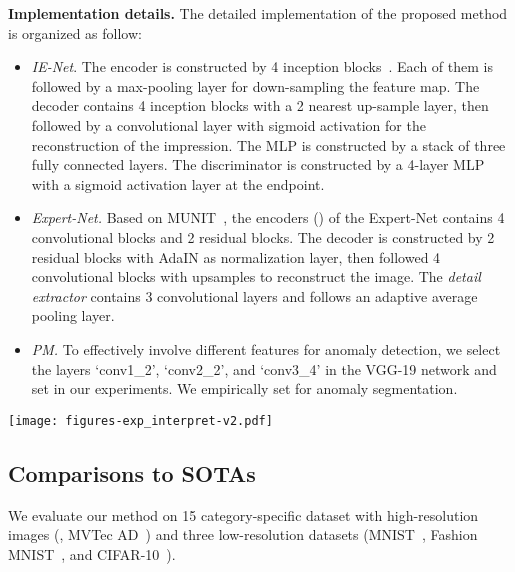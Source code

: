 \documentclass[final]{cvpr}
\newcommand{\proposed}{UTAD}
\begin{document}
\noindent\textbf{Implementation details.}
The detailed implementation of the proposed method is organized as follow:
\begin{itemize}
	\item \textit{IE-Net}. The encoder  is constructed by 4 inception blocks~\cite{B:szegedy2015InceptionNet}. Each of them is followed by a max-pooling layer for down-sampling the feature map. The decoder  contains 4 inception blocks with a 2 nearest up-sample layer, then followed by a  convolutional layer with sigmoid activation for the reconstruction of the impression. The MLP is constructed by a stack of three fully connected layers. The discriminator  is constructed by a 4-layer MLP with a sigmoid activation layer at the endpoint.
	\item \textit{Expert-Net.} Based on MUNIT~\cite{R:huang2018munit}, the encoders () of the Expert-Net contains 4 convolutional blocks and 2 residual blocks. The decoder is constructed by 2 residual blocks with AdaIN as normalization layer, then followed 4 convolutional blocks with upsamples to reconstruct the image. The \textit{detail extractor}  contains 3 convolutional layers and follows an adaptive average pooling layer.
	\item \textit{PM.} To effectively involve different features for anomaly detection, we select the layers `conv1\_2', `conv2\_2', and `conv3\_4' in the VGG-19 network and set  in our experiments. 
We empirically set  for anomaly segmentation.
\end{itemize}


\begin{figure*} 
	\begin{center}
		\texttt{[image: figures-exp\_interpret-v2.pdf]} 
	\end{center}
	\vspace{-0.2cm}
	\caption{Interpretation of the intermediate results in \proposed. As illustrated in dashed boxes, the impression  is robust to anomalous regions, while the na\"ive impression  is affected by the anomalous regions.
	}
	\vspace{-0.2cm}
	\label{fig:viz}
\end{figure*}

\subsection{Comparisons to SOTAs}
We evaluate our method on 15 category-specific dataset with high-resolution images (\ie, MVTec AD~\cite{A:bergmann2019mvtec}) and three low-resolution datasets (MNIST~\cite{B:lecun1998MNIST}, Fashion MNIST~\cite{B:xiao2017FashionMNIST}, and CIFAR-10~\cite{B:krizhevsky2009CIFAR10}).
\end{document}
